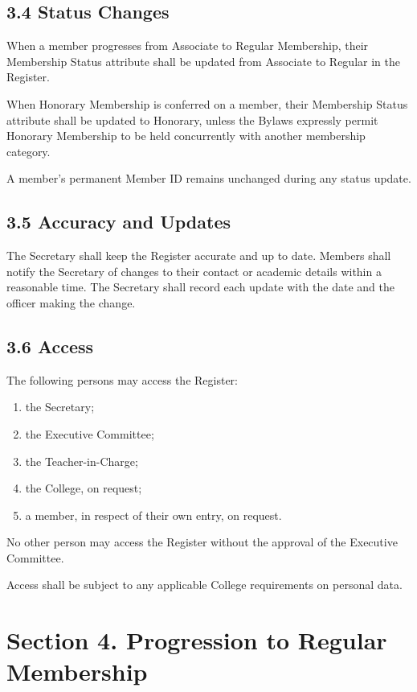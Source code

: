 \documentclass[a4paper]{article}
\begin{document}
\subsection*{3.4 Status Changes}
When a member progresses from Associate to Regular Membership, their
Membership Status attribute shall be updated from Associate to Regular
in the Register.

When Honorary Membership is conferred on a member, their Membership
Status attribute shall be updated to Honorary, unless the Bylaws
expressly permit Honorary Membership to be held concurrently with
another membership category.

A member's permanent Member ID remains unchanged
during any status update.

\subsection*{3.5 Accuracy and Updates}
The Secretary shall keep the Register accurate and up to date. Members
shall notify the Secretary of changes to their contact or academic
details within a reasonable time. The Secretary shall record each
update with the date and the officer making the change.

\subsection*{3.6 Access}
The following persons may access the Register:
\begin{enumerate}
  \item the Secretary;
  \item the Executive Committee;
  \item the Teacher-in-Charge;
  \item the College, on request;
  \item a member, in respect of their own entry, on request.
\end{enumerate}

No other person may access the Register without the approval of the
Executive Committee.

Access shall be subject to any applicable College requirements on
personal data.

\section*{Section 4. Progression to Regular Membership}
\end{document}
